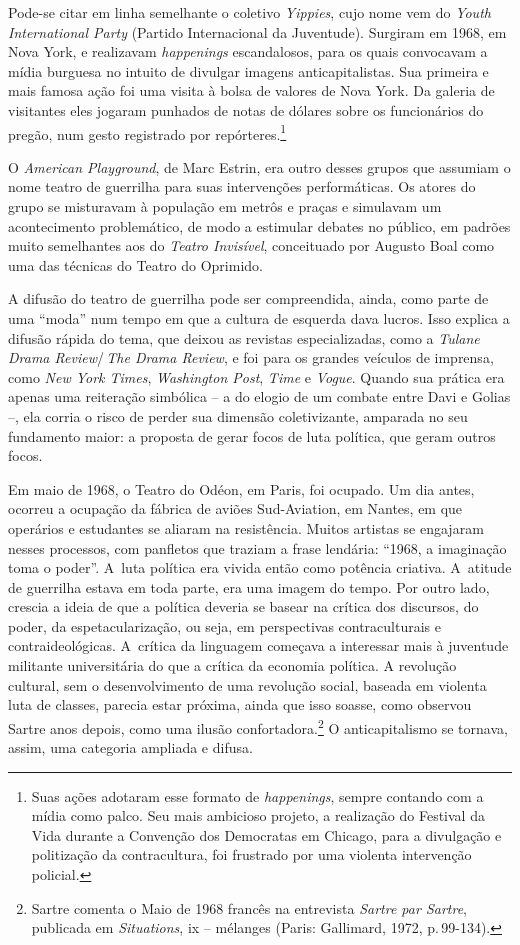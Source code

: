 Pode-se citar em linha semelhante o coletivo {\it Yippies}, cujo nome
vem do {\it Youth International Party} (Partido Internacional da
Juventude). Surgiram em 1968, em Nova York, e realizavam
{\it happenings} escandalosos, para os quais convocavam a mídia
burguesa no intuito de divulgar imagens anticapitalistas. Sua
primeira e mais famosa ação foi uma visita à bolsa de valores de Nova
York. Da galeria de visitantes eles jogaram punhados de notas de
dólares sobre os funcionários do pregão, num gesto registrado por
repórteres.\footnote{Suas ações adotaram esse formato de
  {\it happenings}, sempre contando com a mídia como palco. Seu mais
  ambicioso projeto, a realização do Festival da Vida durante a
  Convenção dos Democratas em Chicago, para a divulgação e
  politização da contracultura, foi frustrado por uma violenta
  intervenção policial.}

O {\it American Playground}, de Marc Estrin, era outro desses grupos que
assumiam o nome teatro de guerrilha para suas intervenções
performáticas. Os atores do grupo se misturavam à população em metrôs e
praças e simulavam um acontecimento problemático, de modo a estimular
debates no público, em padrões muito semelhantes aos do
{\it Teatro Invisível}, conceituado por Augusto Boal como uma das
técnicas do Teatro do Oprimido.

A difusão do teatro de guerrilha pode ser compreendida, ainda,
como parte de uma “moda” num tempo em que a cultura de esquerda dava
lucros. Isso explica a difusão rápida do tema, que deixou as revistas
especializadas, como a {\it Tulane Drama Review}/\,{\it The Drama Review},
e foi para os grandes veículos de imprensa, como {\it New York Times},
{\it Washington Post}, {\it Time} e {\it Vogue}. Quando sua prática era
apenas uma reiteração simbólica -- a do elogio de um combate entre Davi e
Golias --, ela corria o risco de perder sua dimensão coletivizante,
amparada no seu fundamento maior: a proposta de gerar focos de luta
política, que geram outros focos.

Em maio de 1968, o Teatro do Odéon, em Paris, foi ocupado. Um dia antes,
ocorreu a ocupação da fábrica de aviões Sud-Aviation, em Nantes, em que
operários e estudantes se aliaram na resistência. Muitos artistas se
engajaram nesses processos, com panfletos que traziam a frase lendária:
“1968, a imaginação toma o poder”. A~luta política era vivida então como
potência criativa. A~atitude de guerrilha estava em toda parte, era uma
imagem do tempo. Por outro lado, crescia a ideia de que a política
deveria se basear na crítica dos discursos, do poder, da
espetacularização, ou seja, em perspectivas contraculturais e
contraideológicas. A~crítica da linguagem começava a interessar mais à
juventude militante universitária do que a crítica da economia política.
A revolução cultural, sem o desenvolvimento de uma revolução social,
baseada em violenta luta de classes, parecia estar próxima, ainda que
isso soasse, como observou Sartre anos depois, como uma ilusão
confortadora.\footnote{Sartre comenta o Maio de 1968 francês na
  entrevista {\it Sartre par Sartre}, publicada em {\it Situations}, {\sc ix}
  -- mélanges (Paris: Gallimard, 1972, p.\,99-134).} O anticapitalismo se
tornava, assim, uma categoria ampliada e difusa.

